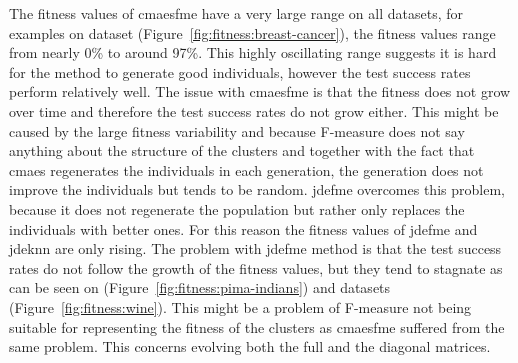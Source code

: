 \documentclass[12pt,a4paper]{report}
\begin{document}
The fitness values of \ac{cmaesfme} have a very large range on all datasets, for examples on  dataset (Figure~\ref{fig:fitness:breast-cancer}), the fitness values range from nearly 0\% to around 97\%. This highly oscillating range suggests it is hard for the method to generate good individuals, however the test success rates perform relatively well. The issue with \ac{cmaesfme} is that the fitness does not grow over time and therefore the test success rates do not grow either. This might be caused by the large fitness variability and because \mbox{F-measure} does not say anything about the structure of the clusters and together with the fact that \ac{cmaes} regenerates the individuals in each generation, the generation does not improve the individuals but tends to be random. \ac{jdefme} overcomes this problem, because it does not regenerate the population but rather only replaces the individuals with better ones. For this reason the fitness values of \ac{jdefme} and \ac{jdeknn} are only rising. The problem with \ac{jdefme} method is that the test success rates do not follow the growth of the fitness values, but they tend to stagnate as can be seen on  (Figure~\ref{fig:fitness:pima-indians}) and  datasets (Figure~\ref{fig:fitness:wine}). This might be a problem of \mbox{F-measure} not being suitable for representing the fitness of the clusters as \ac{cmaesfme} suffered from the same problem. This concerns evolving both the full and the diagonal matrices.

\end{document}
